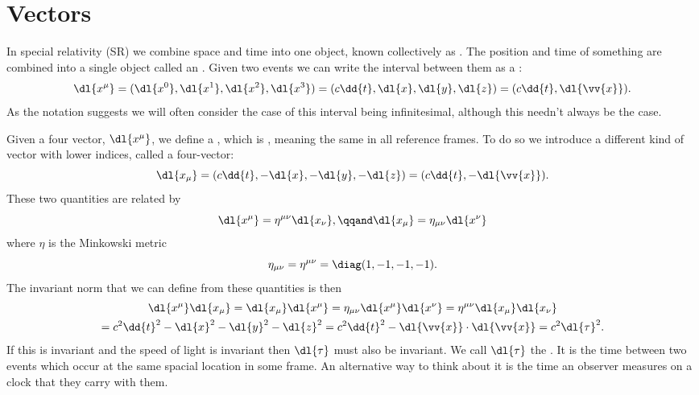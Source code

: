 \documentclass[fleqn]{NotesClass}
\begin{document}
    \section{Vectors}
    In special relativity (SR) we combine space and time into one object, known collectively as .
    The position and time of something are combined into a single object called an .
    Given two events we can write the interval between them as a  :
    \begin{equation}
        \dl{x^\mu} = (\dl{x^0}, \dl{x^1}, \dl{x^2}, \dl{x^3}) = (c \dd{t}, \dl{x}, \dl{y}, \dl{z}) = (c\dd{t}, \dl{\vv{x}}).
    \end{equation}
    As the notation suggests we will often consider the case of this interval being infinitesimal, although this needn't always be the case.
    
    Given a four vector, \(\dl{x^\mu}\), we define a , which is , meaning the same in all reference frames.
    To do so we introduce a different kind of vector with lower indices, called a  four-vector:
    \begin{equation}
        \dl{x_\mu} = (c\dd{t}, -\dl{x}, -\dl{y}, -\dl{z}) = (c\dd{t}, -\dl{\vv{x}}).
    \end{equation}
    These two quantities are related by
    \begin{equation}
        \dl{x^\mu} = \eta^{\mu\nu}\dl{x_\nu}, \qqand \dl{x_\mu} = \eta_{\mu\nu}\dl{x^\nu}
    \end{equation}
    where \(\eta\) is the Minkowski metric
    \begin{equation}
        \eta_{\mu\nu} = \eta^{\mu\nu} = \diag(1, -1, -1, -1).
    \end{equation}   
    The invariant norm that we can define from these quantities is then
    \begin{multline}
        \dl{x^\mu}\dl{x_\mu} = \dl{x_\mu}\dl{x^\mu} = \eta_{\mu\nu}\dl{x^\mu}\dl{x^\nu} = \eta^{\mu\nu}\dl{x_\mu}\dl{x_\nu}\\
        = c^2\dd{t}^2 - \dl{x}^2 - \dl{y}^2 - \dl{z}^2 = c^2\dd{t}^2 - \dl{\vv{x}} \cdot \dl{\vv{x}} = c^2\dl{\tau}^2.
    \end{multline}
    If this is invariant and the speed of light is invariant then \(\dl{\tau}\) must also be invariant.
    We call \(\dl{\tau}\) the .
    It is the time between two events which occur at the same spacial location in some frame.
    An alternative way to think about it is the time an observer measures on a clock that they carry with them.
    
\end{document}
